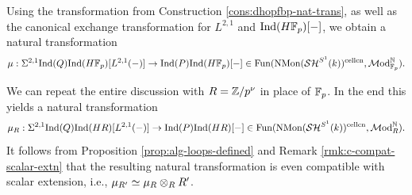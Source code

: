 \documentclass{amsart}
\numberwithin{proposition}{section}
\numberwithin{equation}{section}
\def\cell{\mathrm{cell}}
\def\NMon{\mathrm{NMon}}
\def\cn{\mathrm{cn}}
\def\hLoops{L}
\begin{document}
\begin{construction} \label{cons:main-trafo}
Using the transformation from Construction \ref{cons:dhopfbp-nat-trans}, as well as the canonical exchange transformation for $\hLoops^{2,1}$ and $\mathrm{Ind}(H\mathbb{F}_p)[\mathord-]$, we obtain a natural transformation \[ \mu: \Sigma^{2,1} \Ind(Q) \Ind(H\F_p)[\hLoops^{2,1}(\ph)] \to \Ind(P) \Ind(H\F_p)[\ph] \in \Fun(\NMon(\SH^{S^1}(k))^{\cell\cn}, \Mod_{\F_p}^\N). \]
\end{construction}

\begin{remark} \label{rmk:trafo-scalar-ext}
We can repeat the entire discussion with $R=\mathbb{Z}/p^\nu$ in place of $\mathbb{F}_p$.
In the end this yields a natural transformation \[ \mu_R: \Sigma^{2,1} \Ind(Q) \Ind(HR)[\hLoops^{2,1}(\ph)] \to \Ind(P) \Ind(HR)[\ph] \in \Fun(\NMon(\SH^{S^1}(k))^{\cell\cn}, \Mod_{R}^\N). \]
It follows from Proposition \ref{prop:alg-loops-defined} and Remark \ref{rmk:c-compat-scalar-extn} that the resulting natural transformation is even compatible with scalar extension, i.e., $\mu_{R'} \simeq \mu_R \otimes_R R'$.
\end{remark}
\end{document}
